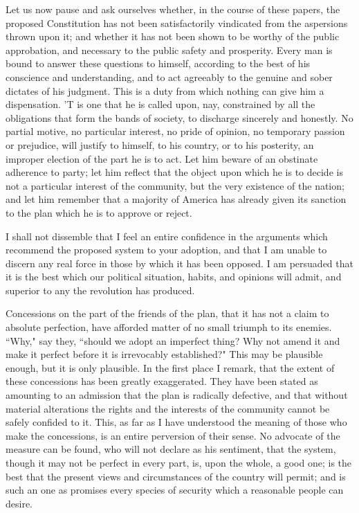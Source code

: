 Let us now pause and ask ourselves whether, in the course of these papers, the proposed Constitution has not been satisfactorily vindicated from the aspersions thrown upon it; and whether it has not been shown to be worthy of the public approbation, and necessary to the public safety and prosperity. Every man is bound to answer these questions to himself, according to the best of his conscience and understanding, and to act agreeably to the genuine and sober dictates of his judgment. This is a duty from which nothing can give him a dispensation. 'T is one that he is called upon, nay, constrained by all the obligations that form the bands of society, to discharge sincerely and honestly. No partial motive, no particular interest, no pride of opinion, no temporary passion or prejudice, will justify to himself, to his country, or to his posterity, an improper election of the part he is to act. Let him beware of an obstinate adherence to party; let him reflect that the object upon which he is to decide is not a particular interest of the community, but the very existence of the nation; and let him remember that a majority of America has already given its sanction to the plan which he is to approve or reject.

I shall not dissemble that I feel an entire confidence in the arguments which recommend the proposed system to your adoption, and that I am unable to discern any real force in those by which it has been opposed. I am persuaded that it is the best which our political situation, habits, and opinions will admit, and superior to any the revolution has produced.

Concessions on the part of the friends of the plan, that it has not a claim to absolute perfection, have afforded matter of no small triumph to its enemies. ``Why," say they, ``should we adopt an imperfect thing? Why not amend it and make it perfect before it is irrevocably established?" This may be plausible enough, but it is only plausible. In the first place I remark, that the extent of these concessions has been greatly exaggerated. They have been stated as amounting to an admission that the plan is radically defective, and that without material alterations the rights and the interests of the community cannot be safely confided to it. This, as far as I have understood the meaning of those who make the concessions, is an entire perversion of their sense. No advocate of the measure can be found, who will not declare as his sentiment, that the system, though it may not be perfect in every part, is, upon the whole, a good one; is the best that the present views and circumstances of the country will permit; and is such an one as promises every species of security which a reasonable people can desire.

